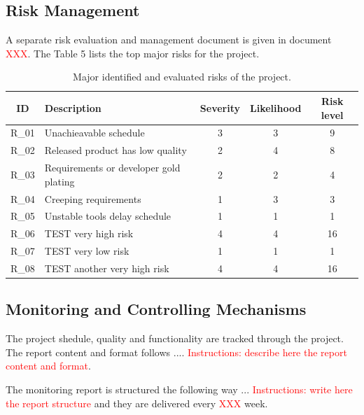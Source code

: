 \documentclass{article}
\begin{document}
\subsection{Risk Management}
A separate risk evaluation and management document is given in document \textcolor{red}{XXX}.
The Table 5 lists the top major risks for the project.

\begin{table}[h]
\centering
\caption{Major identified and evaluated risks of the project.}
\label{tab:project_risks}
\begin{tabular}{|c|l|c|c|c|}
\hline
\textbf{ID} & \textbf{Description} & \textbf{Severity} & \textbf{Likelihood} & \textbf{Risk level} \\
\hline
R\_01 & Unachieavable schedule & 3 & 3 & \cellcolor{yellow} 9 \\
\hline
R\_02 & Released product has low quality & 2 & 4 & \cellcolor{yellow} 8 \\
\hline
R\_03 & Requirements or developer gold plating & 2 & 2 & \cellcolor{lightgreen} 4 \\
\hline
R\_04 & Creeping requirements & 1 & 3 & \cellcolor{lightgreen} 3 \\
\hline
R\_05 & Unstable tools delay schedule & 1 & 1 & \cellcolor{green} 1 \\
\hline
R\_06 & TEST very high risk & 4 & 4 & \cellcolor{red} 16 \\
\hline
R\_07 & TEST very low risk & 1 & 1 & \cellcolor{green}  1 \\
\hline
R\_08 & TEST another very high risk & 4 & 4 & \cellcolor{red} 16 \\
\hline
\end{tabular}
\end{table}

\subsection{Monitoring and Controlling Mechanisms}
The project shedule, quality and functionality are tracked through the project. The
report content and format follows .... \textcolor{red}{Instructions: describe here the report content and format}.

\vspace{0.5cm}

The monitoring report is structured the following way ... \textcolor{red}{ Instructions: write here
the report structure} and they are delivered every  \textcolor{red}{XXX} week.
\end{document}
